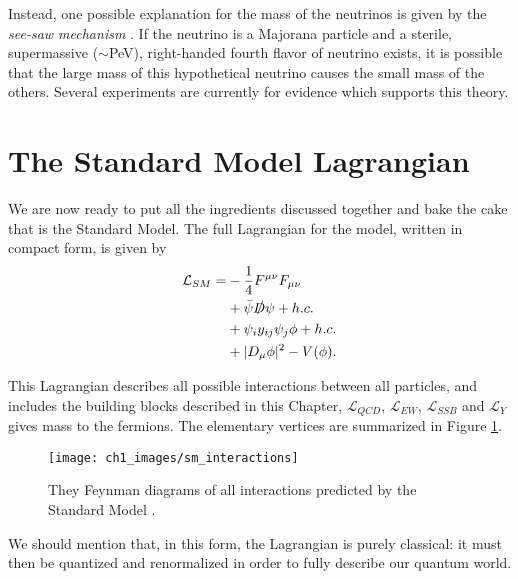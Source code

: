 \documentclass[10pt,a4paper]{book}
\begin{document}
Instead, one possible explanation for the mass of the neutrinos is given by the \emph{see-saw mechanism} \cite{zuber}. If the neutrino is a Majorana particle and a sterile, supermassive ($\sim$PeV), right-handed fourth flavor of neutrino exists, it is possible that the large mass of this hypothetical neutrino causes the small mass of the others. Several experiments are currently for evidence which supports this theory.
\section{The Standard Model Lagrangian}

We are now ready to put all the ingredients discussed together and bake the cake that is the Standard Model. The full Lagrangian for the model, written in compact form, is given by
\begin{equation}
\begin{aligned}
\mathcal{L}_{SM} = &-\frac{1}{4}F^{\mu\nu}F_{\mu\nu}\\ 
&+ \bar{\psi}\slashed{D}\psi + h.c.\\
&+ \psi_iy_{ij}\psi_j\phi + h.c. \\
&+ \vert D_\mu\phi \vert^2 - V(\phi).
\end{aligned}
\end{equation}

This Lagrangian describes all possible interactions between all particles, and includes the building blocks described in this Chapter, $\mathcal{L}_{QCD}$, $\mathcal{L}_{EW}$, $\mathcal{L}_{SSB}$ and $\mathcal{L}_Y$ gives mass to the fermions. The elementary vertices are summarized in Figure \ref{Standard Model interactions}. 

\begin{figure}
\centering
\texttt{[image: ch1\_images/sm\_interactions]}
\caption{They Feynman diagrams of all interactions predicted by the Standard Model \cite{sm_interactions}.}
\label{Standard Model interactions}
\end{figure}

We should mention that, in this form, the Lagrangian is purely classical: it must then be quantized and renormalized \cite{tHooft:1971qjg} in order to fully describe our quantum world. 

	

\nocite{Thomson:2013zua, Ryder:1985wq, Peskin:1995ev, Pich:2012sx}
\end{document}
